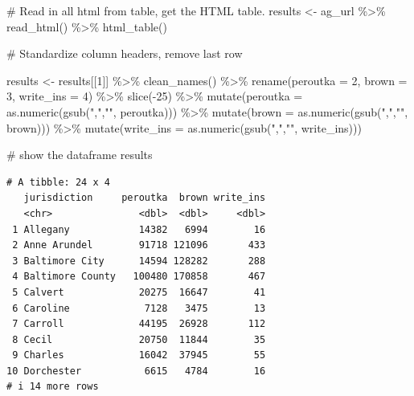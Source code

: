 \documentclass[
  letterpaper,
  DIV=11,
  numbers=noendperiod]{scrreprt}
\newenvironment{Shaded}{\begin{snugshade}}{\end{snugshade}}
\newcommand{\AttributeTok}[1]{\textcolor[rgb]{0.40,0.45,0.13}{#1}}
\newcommand{\CommentTok}[1]{\textcolor[rgb]{0.37,0.37,0.37}{#1}}
\newcommand{\DecValTok}[1]{\textcolor[rgb]{0.68,0.00,0.00}{#1}}
\newcommand{\FunctionTok}[1]{\textcolor[rgb]{0.28,0.35,0.67}{#1}}
\newcommand{\NormalTok}[1]{\textcolor[rgb]{0.00,0.23,0.31}{#1}}
\newcommand{\OtherTok}[1]{\textcolor[rgb]{0.00,0.23,0.31}{#1}}
\newcommand{\SpecialCharTok}[1]{\textcolor[rgb]{0.37,0.37,0.37}{#1}}
\newcommand{\StringTok}[1]{\textcolor[rgb]{0.13,0.47,0.30}{#1}}
\begin{document}
\begin{Shaded}
\begin{Highlighting}[]
\CommentTok{\# Read in all html from table, get the HTML table.}
\NormalTok{results }\OtherTok{\textless{}{-}}\NormalTok{ ag\_url }\SpecialCharTok{\%\textgreater{}\%}
  \FunctionTok{read\_html}\NormalTok{() }\SpecialCharTok{\%\textgreater{}\%}
  \FunctionTok{html\_table}\NormalTok{()}

\CommentTok{\# Standardize column headers, remove last row}

\NormalTok{results }\OtherTok{\textless{}{-}}\NormalTok{ results[[}\DecValTok{1}\NormalTok{]] }\SpecialCharTok{\%\textgreater{}\%}
  \FunctionTok{clean\_names}\NormalTok{() }\SpecialCharTok{\%\textgreater{}\%}
  \FunctionTok{rename}\NormalTok{(}\AttributeTok{peroutka =} \DecValTok{2}\NormalTok{, }\AttributeTok{brown =} \DecValTok{3}\NormalTok{, }\AttributeTok{write\_ins =} \DecValTok{4}\NormalTok{) }\SpecialCharTok{\%\textgreater{}\%}
  \FunctionTok{slice}\NormalTok{(}\SpecialCharTok{{-}}\DecValTok{25}\NormalTok{) }\SpecialCharTok{\%\textgreater{}\%}
  \FunctionTok{mutate}\NormalTok{(}\AttributeTok{peroutka =} \FunctionTok{as.numeric}\NormalTok{(}\FunctionTok{gsub}\NormalTok{(}\StringTok{","}\NormalTok{,}\StringTok{""}\NormalTok{, peroutka))) }\SpecialCharTok{\%\textgreater{}\%}
  \FunctionTok{mutate}\NormalTok{(}\AttributeTok{brown =} \FunctionTok{as.numeric}\NormalTok{(}\FunctionTok{gsub}\NormalTok{(}\StringTok{","}\NormalTok{,}\StringTok{""}\NormalTok{, brown))) }\SpecialCharTok{\%\textgreater{}\%}
  \FunctionTok{mutate}\NormalTok{(}\AttributeTok{write\_ins =} \FunctionTok{as.numeric}\NormalTok{(}\FunctionTok{gsub}\NormalTok{(}\StringTok{","}\NormalTok{,}\StringTok{""}\NormalTok{, write\_ins)))}

\CommentTok{\# show the dataframe}
\NormalTok{results}
\end{Highlighting}
\end{Shaded}

\begin{verbatim}
# A tibble: 24 x 4
   jurisdiction     peroutka  brown write_ins
   <chr>               <dbl>  <dbl>     <dbl>
 1 Allegany            14382   6994        16
 2 Anne Arundel        91718 121096       433
 3 Baltimore City      14594 128282       288
 4 Baltimore County   100480 170858       467
 5 Calvert             20275  16647        41
 6 Caroline             7128   3475        13
 7 Carroll             44195  26928       112
 8 Cecil               20750  11844        35
 9 Charles             16042  37945        55
10 Dorchester           6615   4784        16
# i 14 more rows
\end{verbatim}
\end{document}
